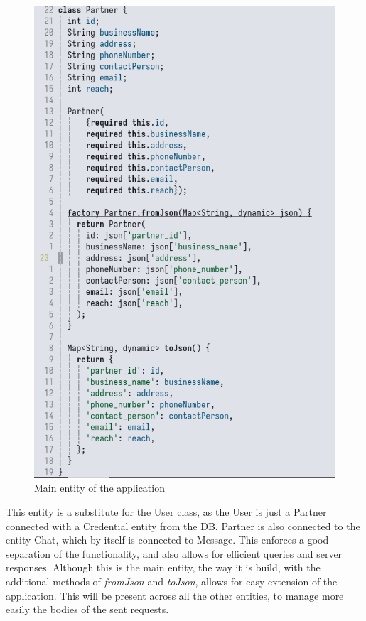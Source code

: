 \begin{figure}[htbp]
    \centering
    \includegraphics[scale=0.4]{pictures/partner_class.png}
    \caption{Main entity of the application}
    \label{partnersClass}
\end{figure}

This entity is a substitute for the User class, as the User is just a Partner connected with a Credential entity from the DB.
Partner is also connected to the entity Chat, which by itself is connected to Message.
This enforces a good separation of the functionality, and also allows for efficient queries and server responses.
Although this is the main entity, the way it is build, with the additional methods of \textit{fromJson} and \textit{toJson}, allows for easy extension of the application.
This will be present across all the other entities, to manage more easily the bodies of the sent requests.

